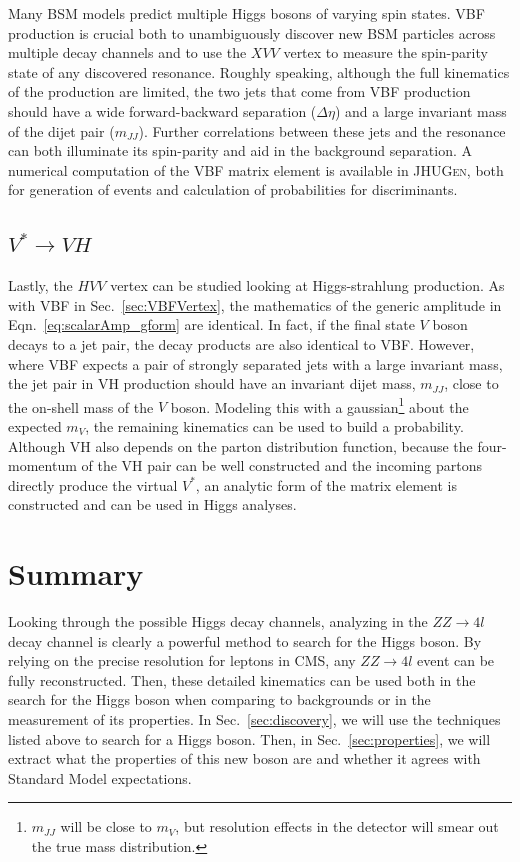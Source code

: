 Many BSM models predict multiple Higgs bosons of varying spin states. VBF production is crucial both to unambiguously discover new BSM particles across multiple decay channels and to use the $XVV$ vertex to measure the spin-parity state of any discovered resonance. Roughly speaking, although the full kinematics of the production are limited, the two jets that come from VBF production should have a wide forward-backward separation ($\Delta\eta$) and a large invariant mass of the dijet pair ($m_{JJ}$). Further correlations between these jets and the resonance can both illuminate its spin-parity and aid in the background separation. A numerical computation of the VBF matrix element is available in \textsc{JHUGen}, both for generation of events and calculation of probabilities for discriminants.

\subsection{$V^* \rightarrow VH$}
\label{sec:VHVertex}

Lastly, the $HVV$ vertex can be studied looking at Higgs-strahlung production. As with VBF in Sec.~\ref{sec:VBFVertex}, the mathematics of the generic amplitude in Eqn.~\ref{eq:scalarAmp_gform} are identical. In fact, if the final state $V$ boson decays to a jet pair, the decay products are also identical to VBF. However, where VBF expects a pair of strongly separated jets with a large invariant mass, the jet pair in VH production should have an invariant dijet mass, $m_{JJ}$, close to the on-shell mass of the $V$ boson. Modeling this with a gaussian\footnote{$m_{JJ}$ will be close to $m_V$, but resolution effects in the detector will smear out the true mass distribution.} about the expected $m_V$, the remaining kinematics can be used to build a probability. Although VH also depends on the parton distribution function, because the four-momentum of the VH pair can be well constructed and the incoming partons directly produce the virtual $V^*$, an analytic form of the matrix element is constructed and can be used in Higgs analyses.

\section{Summary}
\label{sec:pheno_summary}

Looking through the possible Higgs decay channels, analyzing in the $ZZ \rightarrow 4l$ decay channel is clearly a powerful method to search for the Higgs boson. By relying on the precise resolution for leptons in CMS, any $ZZ \rightarrow 4l$ event can be fully reconstructed. Then, these detailed kinematics can be used both in the search for the Higgs boson when comparing to backgrounds or in the measurement of its properties. In Sec.~\ref{sec:discovery}, we will use the techniques listed above to search for a Higgs boson. Then, in Sec.~\ref{sec:properties}, we will extract what the properties of this new boson are and whether it agrees with Standard Model expectations.
